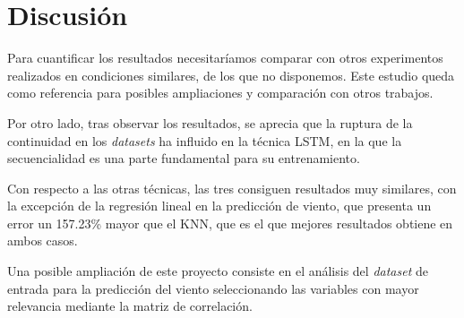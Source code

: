 \documentclass[journal]{IEEEtran}
\begin{document}
%

\section{Discusión}
Para cuantificar los resultados necesitaríamos comparar con otros experimentos realizados en condiciones similares, de los que no disponemos. Este estudio queda como referencia para posibles ampliaciones y comparación con otros trabajos.

Por otro lado, tras observar los resultados, se aprecia que la ruptura de la continuidad en los \emph{datasets} ha influido en la técnica LSTM, en la que la secuencialidad es una parte fundamental para su entrenamiento. 

Con respecto a las otras técnicas, las tres consiguen resultados muy similares, con la excepción de la regresión lineal en la predicción de viento, que presenta un error  un 157.23\% mayor que el KNN, que es el que mejores resultados obtiene en ambos casos. 


Una posible ampliación de este proyecto consiste en el análisis del \emph{dataset} de entrada para la predicción del viento seleccionando las variables con mayor relevancia mediante la matriz de correlación.
\end{document}
